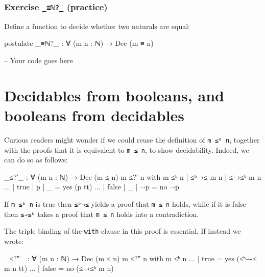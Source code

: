 \hypertarget{exercise-_ux2115_-practice}{%
\subsubsection{\texorpdfstring{Exercise \texttt{\_≡ℕ?\_}
(practice)}{Exercise \_≡ℕ?\_ (practice)}}\label{exercise-_ux2115_-practice}}

Define a function to decide whether two naturals are equal:

\begin{fence}
\begin{code}
postulate
  _≡ℕ?_ : ∀ (m n : ℕ) → Dec (m ≡ n)
\end{code}
\end{fence}

\begin{fence}
\begin{code}
-- Your code goes here
\end{code}
\end{fence}

\hypertarget{decidables-from-booleans-and-booleans-from-decidables}{%
\section{Decidables from booleans, and booleans from
decidables}\label{decidables-from-booleans-and-booleans-from-decidables}}

Curious readers might wonder if we could reuse the definition of
\texttt{m\ ≤ᵇ\ n}, together with the proofs that it is equivalent to
\texttt{m\ ≤\ n}, to show decidability. Indeed, we can do so as follows:

\begin{fence}
\begin{code}
_≤?′_ : ∀ (m n : ℕ) → Dec (m ≤ n)
m ≤?′ n with m ≤ᵇ n | ≤ᵇ→≤ m n | ≤→≤ᵇ {m} {n}
...        | true   | p        | _            = yes (p tt)
...        | false  | _        | ¬p           = no ¬p
\end{code}
\end{fence}

If \texttt{m\ ≤ᵇ\ n} is true then \texttt{≤ᵇ→≤} yields a proof that
\texttt{m\ ≤\ n} holds, while if it is false then \texttt{≤→≤ᵇ} takes a
proof that \texttt{m\ ≤\ n} holds into a contradiction.

The triple binding of the \texttt{with} clause in this proof is
essential. If instead we wrote:

\begin{myDisplay}
_≤?″_ : ∀ (m n : ℕ) → Dec (m ≤ n)
m ≤?″ n with m ≤ᵇ n
... | true   =  yes (≤ᵇ→≤ m n tt)
... | false  =  no (≤→≤ᵇ {m} {n})
\end{myDisplay}

